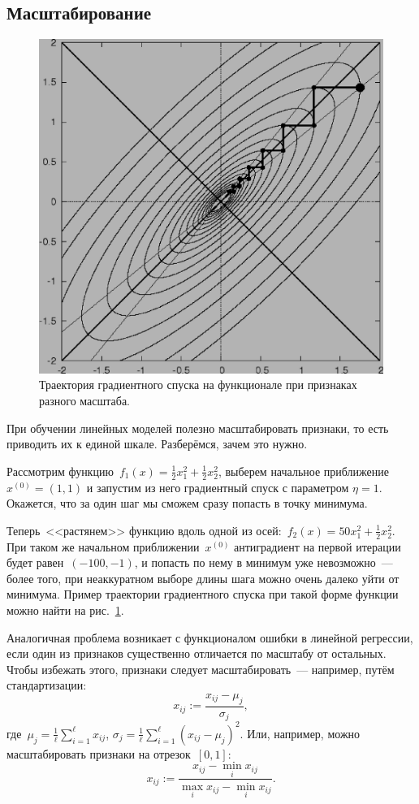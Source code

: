 \documentclass[12pt,fleqn]{article}
\begin{document}
\subsection{Масштабирование}

\begin{figure}[t]
    \centering
    \includegraphics[width=0.4\linewidth]{pics/descent.eps}
    \caption{Траектория градиентного спуска на функционале при признаках разного масштаба.}
    \label{pic:descent}
\end{figure}

При обучении линейных моделей полезно масштабировать признаки, то есть приводить их к единой шкале.
Разберёмся, зачем это нужно.

Рассмотрим функцию~$f_1(x) = \frac{1}{2} x_1^2 + \frac{1}{2} x_2^2$, выберем начальное приближение~$x^{(0)} = (1, 1)$
и запустим из него градиентный спуск с параметром $\eta = 1$.
Окажется, что за один шаг мы сможем сразу попасть в точку минимума.

Теперь~<<растянем>> функцию вдоль одной из осей:~$f_2(x) = 50 x_1^2 + \frac{1}{2} x_2^2$.
При таком же начальном приближении~$x^{(0)}$ антиградиент на первой итерации будет равен~$(-100, -1)$,
и попасть по нему в минимум уже невозможно~--- более того, при неаккуратном выборе длины шага можно
очень далеко уйти от минимума.
Пример траектории градиентного спуска при такой форме функции можно найти на рис.~\ref{pic:descent}.

Аналогичная проблема возникает с функционалом ошибки в линейной регрессии, если один из признаков
существенно отличается по масштабу от остальных.
Чтобы избежать этого, признаки следует масштабировать~--- например, путём стандартизации:
\[
    x_{ij}
    :=
    \frac{x_{ij} - \mu_j}{\sigma_j},
\]
где~$\mu_j = \frac{1}{\ell} \sum_{i = 1}^{\ell} x_{ij}$,
$\sigma_j = \frac{1}{\ell} \sum_{i = 1}^{\ell} (x_{ij} - \mu_j)^2$.
Или, например, можно масштабировать признаки на отрезок~$[0, 1]$:
\[
    x_{ij}
    :=
    \frac{x_{ij} - \min_i x_{ij}}{\max_i x_{ij} - \min_i x_{ij}}.
\]
\end{document}
